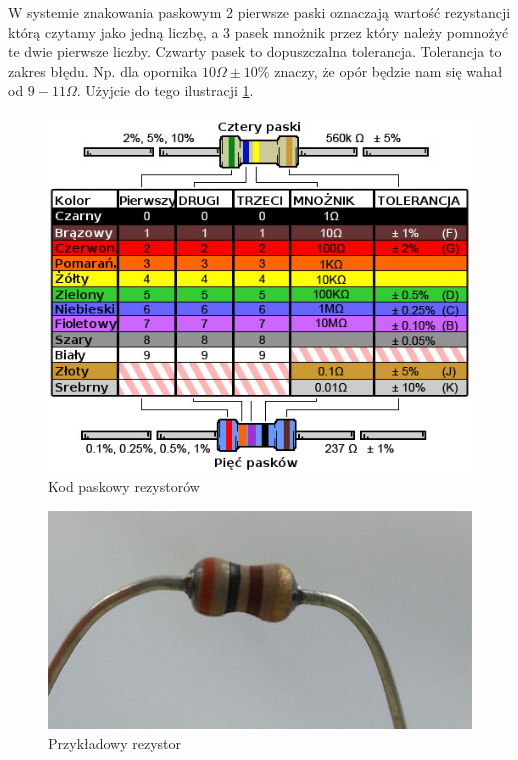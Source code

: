 \documentclass[a4paper,12pt, twoside]{article}
\begin{document}
W systemie znakowania paskowym 2 pierwsze paski oznaczają wartość rezystancji którą czytamy jako jedną liczbę, a 3 pasek mnożnik przez który należy pomnożyć te dwie pierwsze liczby.
Czwarty pasek to dopuszczalna tolerancja. Tolerancja to zakres błędu. Np. dla opornika $10\Omega \pm 10\%$ znaczy, że opór będzie nam się wahał od $9-11\Omega $. Użyjcie do tego ilustracji \ref{fig:kod}.
\begin{figure}[h]
 \centering
  \includegraphics[scale=0.7]{kod_paskowy.jpg}
  \caption{Kod paskowy rezystorów}
  \label{fig:kod}
\end{figure}
\begin{figure}
 \centering
  \includegraphics[scale=0.4]{opornik.jpg}
  \caption{Przykładowy rezystor}
  \label{fig:rez_zad}
\end{figure}
\FloatBarrier

    
          
\end{document}
